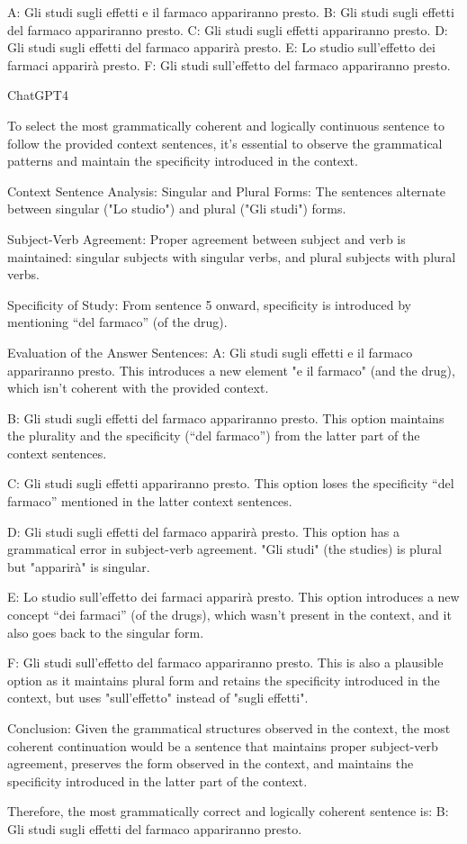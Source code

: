 A: Gli studi sugli effetti e il farmaco appariranno presto.
B: Gli studi sugli effetti del farmaco appariranno presto.
C: Gli studi sugli effetti appariranno presto.
D: Gli studi sugli effetti del farmaco apparirà presto.
E: Lo studio sull'effetto dei farmaci apparirà presto.
F: Gli studi sull'effetto del farmaco appariranno presto.





ChatGPT4

To select the most grammatically coherent and logically continuous sentence to follow the provided context sentences, it’s essential to observe the grammatical patterns and maintain the specificity introduced in the context.

Context Sentence Analysis:
Singular and Plural Forms:
The sentences alternate between singular ("Lo studio") and plural ("Gli studi") forms.

Subject-Verb Agreement:
Proper agreement between subject and verb is maintained: singular subjects with singular verbs, and plural subjects with plural verbs.

Specificity of Study:
From sentence 5 onward, specificity is introduced by mentioning “del farmaco” (of the drug).

Evaluation of the Answer Sentences:
A: Gli studi sugli effetti e il farmaco appariranno presto.
This introduces a new element "e il farmaco" (and the drug), which isn't coherent with the provided context.

B: Gli studi sugli effetti del farmaco appariranno presto.
This option maintains the plurality and the specificity (“del farmaco”) from the latter part of the context sentences.

C: Gli studi sugli effetti appariranno presto.
This option loses the specificity “del farmaco” mentioned in the latter context sentences.

D: Gli studi sugli effetti del farmaco apparirà presto.
This option has a grammatical error in subject-verb agreement. "Gli studi" (the studies) is plural but "apparirà" is singular.

E: Lo studio sull'effetto dei farmaci apparirà presto.
This option introduces a new concept “dei farmaci” (of the drugs), which wasn’t present in the context, and it also goes back to the singular form.

F: Gli studi sull'effetto del farmaco appariranno presto.
This is also a plausible option as it maintains plural form and retains the specificity introduced in the context, but uses "sull'effetto" instead of "sugli effetti".

Conclusion:
Given the grammatical structures observed in the context, the most coherent continuation would be a sentence that maintains proper subject-verb agreement, preserves the form observed in the context, and maintains the specificity introduced in the latter part of the context.

Therefore, the most grammatically correct and logically coherent sentence is:
B: Gli studi sugli effetti del farmaco appariranno presto.


